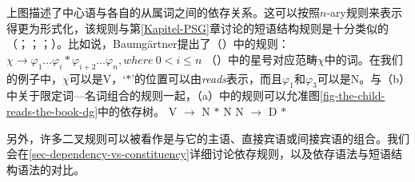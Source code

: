 上图描述了中心语与各自的从属词之间的依存关系。这可以按照$n$-ary规则\label{page-rule-format-dg}来表示得更为形式化，该规则与第\ref{Kapitel-PSG}章讨论的短语结构规则是十分类似的（\citealp[]{Gaifman65a}；\citealp[]{Hays64a-u}；\citealp[]{Baumgaertner70a}；\citealp[\S~4.1]{Heringer96a-u}）。比如说，Baumgärtner提出了（）中的规则：
\ea
$\chi \to \varphi_1 \ldots \varphi_i * \varphi_{i+2} \ldots \varphi_n, where~0 < i \leq n$
\z
（）中的星号对应范畴$\chi$中的词。在我们的例子中，$\chi$可以是V，`$*$'的位置可以由\emph{reads}表示，而且$\varphi_1$和$\varphi_3$可以是N。与（b）中关于限定词—名词组合的规则一起，（a）中的规则可以允准图\ref{fig-the-child-reads-the-book-dg}中的依存树。
\eal
\ex V $\to$ N $*$ N
\ex N $\to$ D $*$
\zl

\noindent
另外，许多二叉规则可以被看作是与它的主语、直接宾语或间接宾语的组合\citep{Kahane2009a}。我们会在\ref{sec-dependency-vs-constituency}详细讨论依存规则，以及依存语法与短语结构语法的对比。


